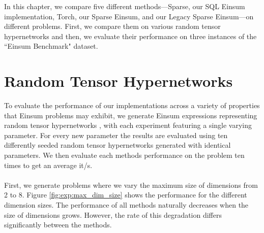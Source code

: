 
In this chapter, we compare five different methods—Sparse, our SQL Einsum implementation, Torch, 
our Sparse Einsum, and our Legacy Sparse Einsum—on different problems. First, we compare them on 
various random tensor hypernetworks and then, we evaluate their performance on three instances of 
the ``Einsum Benchmark" \cite{einsum_benchmark} dataset.

\section{Random Tensor Hypernetworks}
To evaluate the performance of our implementations across a variety of properties that Einsum 
problems may exhibit, we generate Einsum expressions representing random tensor hypernetworks 
\cite{einsum_benchmark}, with each experiment featuring a single varying parameter. For every new 
parameter the results are evaluated using ten differently seeded random tensor hypernetworks 
generated with identical parameters. We then evaluate each methods performance on the problem 
ten times to get an average it/s.
\\
\\
First, we generate problems where we vary the maximum size of dimensions from 2 to 8. 
Figure \ref{fig:exp:max_dim_size} shows the performance for the different dimension sizes. 
The performance of all methods naturally decreases when the size of dimensions grows. However, 
the rate of this degradation differs significantly between the methods.

